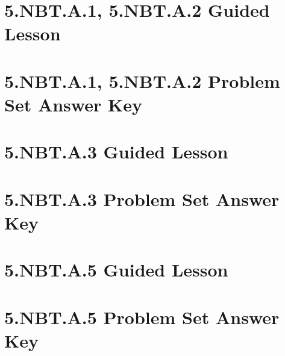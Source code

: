 \documentclass[a4paper,12pt]{article}
\title{}
\date{}
\begin{document}

\hypertarget{toc}{}  %

\tableofcontents
\newpage

\pagestyle{fancy}  %

\newpage
\section{5.NBT.A.1, 5.NBT.A.2 Guided Lesson}


\newpage
\section{5.NBT.A.1, 5.NBT.A.2 Problem Set Answer Key}


\newpage
\section{5.NBT.A.3 Guided Lesson}


\newpage
\section{5.NBT.A.3 Problem Set Answer Key}


\newpage
\section{5.NBT.A.5 Guided Lesson}


\newpage
\section{5.NBT.A.5 Problem Set Answer Key}

\end{document}
